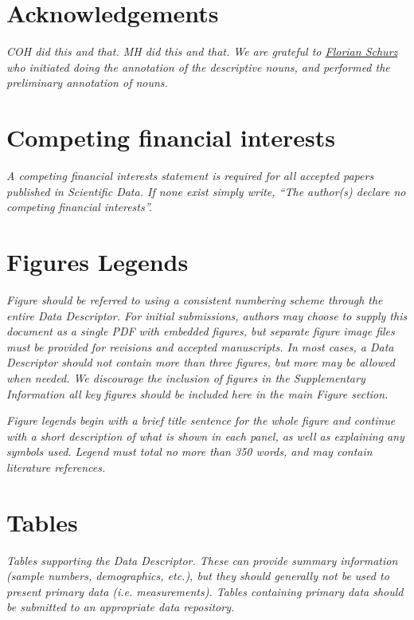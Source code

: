 \documentclass[english]{article}
\begin{document}
\section*{Acknowledgements}
\emph{COH did this and that.
    MH did this and that.
    We are grateful to \href{www.florianschurz.de}{Florian Schurz} who initiated doing the annotation of the descriptive nouns, and performed the preliminary annotation of nouns.}

\section*{Competing financial interests}
\emph{A competing financial interests statement is required for all accepted
papers published in \emph{Scientific Data}. If none exist simply write,
``The author(s) declare no competing financial interests''.}

\section*{Figures Legends}
\emph{Figure should be referred to using a consistent numbering scheme through
the entire Data Descriptor. For initial submissions, authors may choose
to supply this document as a single PDF with embedded figures, but
separate figure image files must be provided for revisions and accepted
manuscripts. In most cases, a Data Descriptor should not contain more
than three figures, but more may be allowed when needed. We discourage
the inclusion of figures in the Supplementary Information \textendash{}
all key figures should be included here in the main Figure section.}

\emph{Figure legends begin with a brief title sentence for the whole figure
and continue with a short description of what is shown in each panel,
as well as explaining any symbols used. Legend must total no more
than 350 words, and may contain literature references.}

\section*{Tables}

\emph{Tables supporting the Data Descriptor. These can provide summary information
(sample numbers, demographics, etc.), but they should generally not
be used to present primary data (i.e. measurements). Tables containing
primary data should be submitted to an appropriate data repository.}
\end{document}
